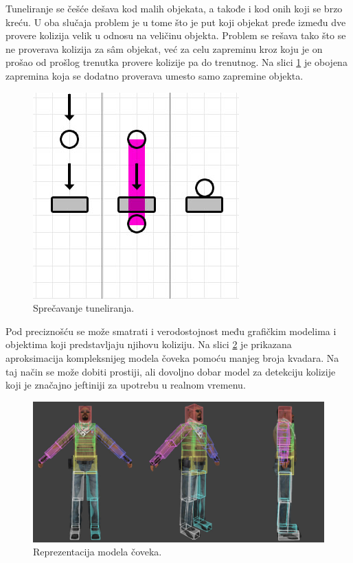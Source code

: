 \documentclass[12pt,oneside]{memoir}
\begin{document}
Tuneliranje se češće dešava kod malih objekata, a takođe i kod 
onih koji se brzo kreću. U oba slučaja problem je u tome što je put koji objekat pređe između dve provere 
kolizija velik u odnosu na veličinu objekta. 
Problem se rešava tako što se ne proverava kolizija za sâm objekat, već za celu zapreminu kroz koju je on prošao 
od prošlog trenutka provere kolizije pa do trenutnog. Na slici \ref{fig:tunnel_fix} je obojena zapremina 
koja se dodatno proverava umesto samo zapremine objekta.



\begin{figure}[h!]
	\begin{center}
	\includegraphics[scale=0.55]{tunnel_fixed.png}
	\end{center}
	\caption{Sprečavanje tuneliranja.}
	\label{fig:tunnel_fix}
\end{figure}

Pod preciznošću se može smatrati i verodostojnost među grafičkim modelima i objektima koji predstavljaju njihovu koliziju.
Na slici \ref{fig:hitbox} je prikazana aproksimacija kompleksnijeg modela čoveka pomoću manjeg broja kvadara.
Na taj način se može dobiti prostiji, ali dovoljno dobar model za detekciju kolizije koji je značajno 
jeftiniji za upotrebu u realnom vremenu. 

\begin{figure}[h!]
	\begin{center}
	\includegraphics[scale=0.55]{hitbox.png}
	\end{center}
	\caption{Reprezentacija modela čoveka.}
	\label{fig:hitbox}
\end{figure}
\end{document}
